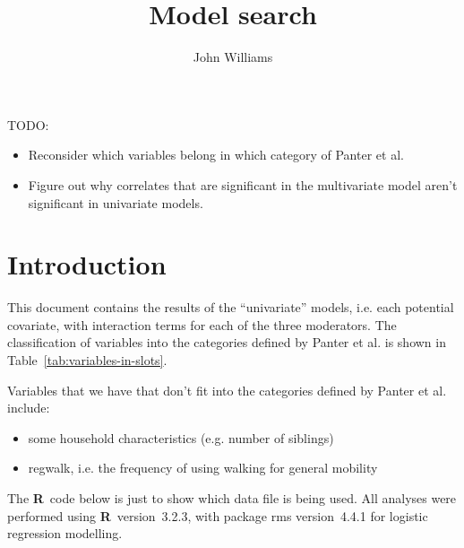 \documentclass[a4paper]{article}
\title{Model search}
\author{John Williams}
\newcommand{\R}{\textbf{\sffamily R}}
\begin{document}
\maketitle
\tableofcontents
\thispagestyle{empty}
\par
\vspace{1em}
TODO:
\begin{itemize}
\item Reconsider which variables  belong in which category of Panter et al.
\item Figure out why correlates that are significant in the multivariate model aren't significant in univariate models.
\end{itemize}



\clearpage
\section*{Introduction}
This document contains the results of the ``univariate'' models, i.e. each
potential covariate, with interaction terms for each of the three moderators.
The classification of variables into the categories defined by Panter et al. is
shown in Table~\vref{tab:variables-in-slots}.

Variables that we have that don't fit into the categories defined by Panter et
al. include:

\begin{itemize}
\item some household characteristics (e.g. number of siblings)
\item regwalk, i.e. the frequency of using walking for general mobility
\end{itemize}

The \R\ code below is just to show which data file is being used. All
analyses were performed using \R\ version~3.2.3, with package \textsf{rms}
version~4.4.1 for logistic regression modelling.

\begin{knitrout}\small
{}\color{fgcolor}\begin{kframe}
\begin{alltt}
 \hlkwb{<-} 
 \hlkwb{<-} \hlstd{(}
\end{alltt}


{\ttfamily\noindent\bfseries\color{errorcolor}{Error: Unknown extension '.'}}\begin{alltt}
\end{alltt}
\end{kframe}
\end{knitrout}
\end{document}
